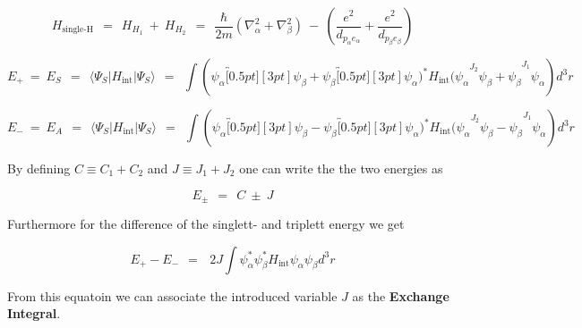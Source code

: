 \documentclass[10pt]{report}
\numberwithin{equation}{chapter}
\begin{document}
\begin{equation}
  H_\text{single-H} ~~=~~ H_{H_1} ~+~ H_{H_2} ~~=~~ 
  \frac{\hbar}{2m} \left( \nabla^2_\alpha + \nabla^2_\beta \right) ~-~ 
  \left(\frac{e^2}{d_{p_\alpha e_\alpha}} + \frac{e^2}{d_{p_\beta e_\beta}} \right)
\end{equation}



\begin{equation}
  E_+ ~=~E_S ~~=~~ \langle \Psi_S | H_\text{int} | \Psi_S \rangle ~~=~~
  \int ( \psi_\alpha \overbracket[0.5pt][3pt]{ \psi_\beta + \psi_\beta \overbracket[0.5pt][3pt]{ \psi_\alpha )^* H_\text{int} 
  ( \psi_\alpha }^{J_2} \psi_\beta + \psi_\beta}^{J_1}  \psi_\alpha ) d^3r
\end{equation}



\begin{equation}
  E_- ~=~E_A ~~=~~ \langle \Psi_S | H_\text{int} | \Psi_S \rangle ~~=~~
  \int ( \psi_\alpha \overbracket[0.5pt][3pt]{ \psi_\beta - \psi_\beta \overbracket[0.5pt][3pt]{ \psi_\alpha )^* H_\text{int} 
  ( \psi_\alpha }^{J_2} \psi_\beta - \psi_\beta}^{J_1} \psi_\alpha ) d^3r
\end{equation}


By defining $C \equiv C_1+C_2$ and $J \equiv J_1+J_2$ one can write the the two energies as

\begin{equation}
  E_\pm ~~=~~ C ~\pm~ J
\end{equation}

Furthermore for the difference of the singlett- and triplett energy we get

\begin{equation}
  E_+ - E_- ~~=~~~2J \int \psi^*_\alpha \psi^*_\beta H_\text{int} \psi_\alpha \psi_\beta d^3r
\end{equation}

From this equatoin we can associate the introduced variable $J$ as the \textbf{Exchange Integral}.
\end{document}
